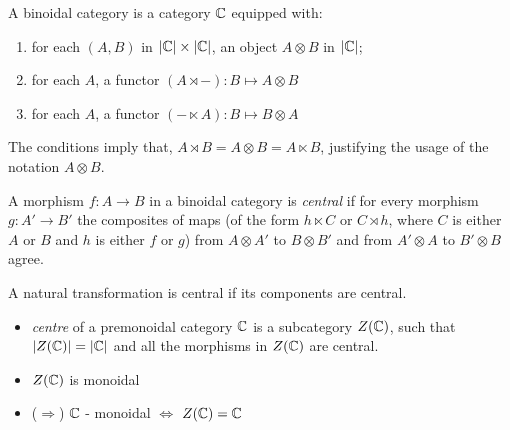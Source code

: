 \begin{frame}
\begin{definition}
    A binoidal category is a category $\mathbb{C}$ equipped with:
    \begin{enumerate}
        \item for each $(A, B)$ in $|\mathbb{C}| \times |\mathbb{C}|$, an object $A \otimes B$
            in $|\mathbb{C}|$;
        \item for each $A$, a functor $(A \rtimes -) : B \mapsto A \otimes B$
        \item for each $A$, a functor $(- \ltimes A) : B \mapsto B \otimes A$
    \end{enumerate}
\end{definition}

The conditions imply that, $A \rtimes B = A \otimes B = A \ltimes B$,
justifying the usage of the notation $A \otimes B$.
\end{frame}

\begin{frame}
\begin{definition}
    A morphism $f: A \to B$ in a binoidal category is \emph{central} if for
    every morphism $g: A' \to B'$ the composites of maps (of the form $h
    \ltimes C$ or $C \rtimes h$, where $C$ is either $A$ or $B$ and $h$ is
    either $f$ or $g$) from $A \otimes A'$ to $B \otimes B'$ and from $A'
    \otimes A$ to $B' \otimes B$ agree.
\end{definition}
A natural transformation is central if its components are central.
\end{frame}


\begin{frame}
\begin{itemize}
    \item \emph{centre} of a premonoidal category $\mathbb{C}$ is a subcategory
        $Z(\mathbb{C})$, such that $|Z(\mathbb{C})| = |\mathbb{C}|$ and all the morphisms in
        $Z(\mathbb{C})$ are central.

    \item $Z(\mathbb{C})$ is monoidal

    \item ($\Rightarrow$) $\mathbb{C}$ - monoidal $\iff$ $Z(\mathbb{C}) = \mathbb{C}$
\end{itemize}
\end{frame}

